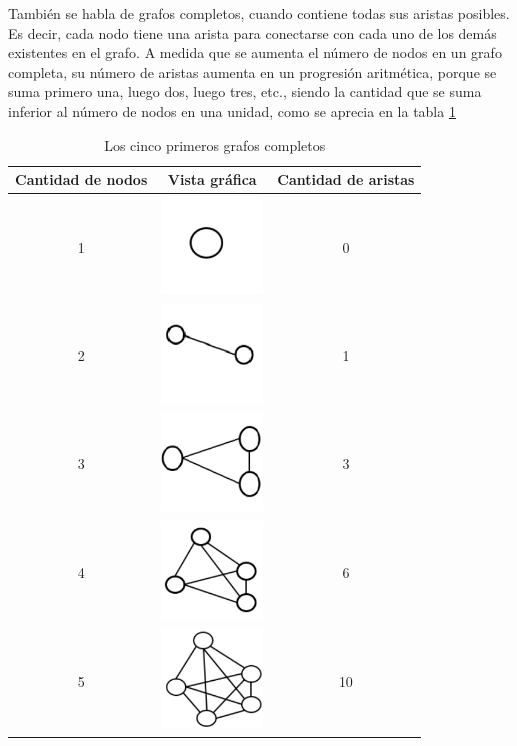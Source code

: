 También se habla de grafos completos, cuando contiene todas sus aristas posibles. Es decir, cada nodo tiene una arista para conectarse con cada uno de los demás existentes en el grafo. A medida que se aumenta el número de nodos en un grafo completa, su número de aristas aumenta en un progresión aritmética, porque se suma primero una, luego dos, luego tres, etc., siendo la cantidad que se suma inferior al número de nodos en una unidad, como se aprecia en la tabla \ref{cmpletos}

\begin{table}[H]
\centering
\caption{Los cinco primeros grafos completos}
\begin{tabular}[c]{|c|c|c|}
\hline
\textbf{Cantidad de nodos} & \textbf{Vista gráfica} & \textbf{Cantidad de aristas} \\ \hline
1 & \multicolumn{1}{l|}{\includegraphics[align=t, width=27mm]{1nodo.png} }  & 0 \\ \hline
2 & \multicolumn{1}{l|}{\includegraphics[align=t, width=27mm]{2nodos.png} }  & 1\\ \hline
3 & \multicolumn{1}{l|}{\includegraphics[align=t, width=27mm]{3nodos.png} }  & 3 \\ \hline
4 & \multicolumn{1}{l|}{\includegraphics[align=t, width=27mm]{4nodos.png} }  & 6 \\ \hline
5 & \multicolumn{1}{l|}{\includegraphics[align=t, width=27mm]{5nodos.png} }  & 10 \\ \hline
\end{tabular}
\label{cmpletos}
\end{table}

